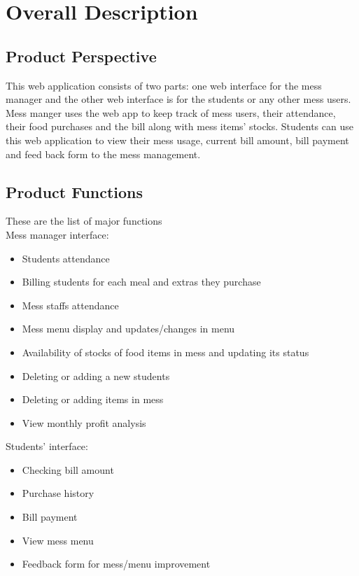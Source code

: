 \documentclass{scrreprt}
\begin{document}
\chapter{Overall Description}

\section{Product Perspective}
This web application consists of two parts: one web interface for the mess manager and the other web interface is for the students or any other mess users. Mess manger uses the web app to keep track of mess users, their attendance, their food purchases and the bill along with mess items’ stocks. Students can use this web application to view their mess usage, current bill amount, bill payment and feed back form to the mess management. 

\section{Product Functions}
These are the list of major functions \\
Mess manager interface:
\begin{itemize}
	\item Students attendance \\
    \item Billing students for each meal and extras they purchase \\
    \item Mess staffs attendance \\
    \item Mess menu display and updates/changes in menu \\
    \item Availability of stocks of food items in mess and updating its status\\
    \item Deleting or adding a new students \\
    \item Deleting or adding items in mess \\
    \item View monthly profit analysis  \\

	\end{itemize}
Students’ interface:
\begin{itemize}
    \item Checking bill amount \\
    \item Purchase history\\
    \item Bill payment \\
    \item View mess menu \\
    \item Feedback form for mess/menu improvement \\
\end{itemize}   
\end{document}
